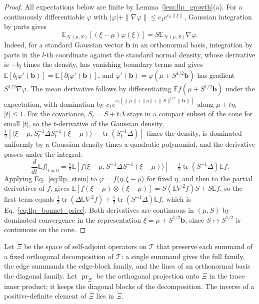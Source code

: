 \begin{proof}
All expectations below are finite by Lemma~\ref{lem:llp_growth}(a). For a continuously differentiable $\varphi$ with $|\varphi|+\|\nabla\varphi\|\leq c_1e^{c_2\|\xi\|}$, Gaussian integration by parts gives
\begin{equation}
\mathbb E_{\mathcal N(\mu,S)}[(\xi-\mu)\varphi(\xi)]=S\mathbb E_{\mathcal N(\mu,S)}\nabla\varphi.
\label{eq:llp_stein}
\end{equation}
Indeed, for a standard Gaussian vector $\mathbf b$ in an orthonormal basis, integration by parts in the $l$-th coordinate against the standard normal density, whose derivative is $-b_l$ times the density, has vanishing boundary terms and gives $\mathbb E[b_l\varphi'(\mathbf b)]=\mathbb E[\partial_l\varphi'(\mathbf b)]$, and $\varphi'(\mathbf b)=\varphi(\mu+S^{1/2}\mathbf b)$ has gradient $S^{1/2}\nabla\varphi$. The mean derivative follows by differentiating $\mathbb Ef(\mu+S^{1/2}\mathbf b)$ under the expectation, with domination by $c_1e^{c_2(\|\mu\|+\|\eta\|+\|S\|^{1/2}\|\mathbf b\|)}$ along $\mu+t\eta$, $|t|\leq1$. For the covariance, $S_t=S+t\Delta$ stays in a compact subset of the cone for small $|t|$, so the $t$-derivative of the Gaussian density, $\frac12[\langle\xi-\mu,S_t^{-1}\Delta S_t^{-1}(\xi-\mu)\rangle-\operatorname{tr}(S_t^{-1}\Delta)]$ times the density, is dominated uniformly by a Gaussian density times a quadratic polynomial, and the derivative passes under the integral:
\begin{equation*}
\frac{d}{dt}\mathbb Ef\Big|_{t=0}=\tfrac12\mathbb E[f\langle\xi-\mu,S^{-1}\Delta S^{-1}(\xi-\mu)\rangle]-\tfrac12\operatorname{tr}(S^{-1}\Delta)\mathbb Ef.
\end{equation*}
Applying Eq.~\eqref{eq:llp_stein} to $\varphi=f\langle\eta,\xi-\mu\rangle$ for fixed $\eta$, and then to the partial derivatives of $f$, gives $\mathbb E[f(\xi-\mu)\otimes(\xi-\mu)]=S(\mathbb E\nabla^2f)S+S\mathbb Ef$, so the first term equals $\frac12\operatorname{tr}(\Delta\mathbb E\nabla^2f)+\frac12\operatorname{tr}(S^{-1}\Delta)\mathbb Ef$, which is Eq.~\eqref{eq:llp_bonnet_price}. Both derivatives are continuous in $(\mu,S)$ by dominated convergence in the representation $\xi=\mu+S^{1/2}\mathbf b$, since $S\mapsto S^{1/2}$ is continuous on the cone.
\end{proof}

Let $\mathring\Xi$ be the space of self-adjoint operators on $\mathcal T$ that preserve each summand of a fixed orthogonal decomposition of $\mathcal T$: a single summand gives the full family, the edge summands the edge-block family, and the lines of an orthonormal basis the diagonal family. Let $\operatorname{pr}_{\mathring\Xi}$ be the orthogonal projection onto $\mathring\Xi$ in the trace inner product; it keeps the diagonal blocks of the decomposition. The inverse of a positive-definite element of $\mathring\Xi$ lies in $\mathring\Xi$.

